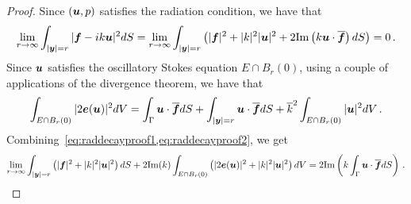 \begin{proof}
Since $({\boldsymbol u},p)$ satisfies the radiation condition, we have that
\begin{equation}
\lim_{r\to\infty} \int_{|{\boldsymbol y}|=r} | {\boldsymbol f} - i k {\boldsymbol u}|^2 dS = 
\lim_{r\to\infty} \int_{|{\boldsymbol y}| =r} \left( |{\boldsymbol f}|^2 + |k|^2|{\boldsymbol u}|^2 + 2 {\textrm{\textup{Im}}} 
\left( k {\boldsymbol u}\cdot \overline{{\boldsymbol f}} \right) dS \label{eq:raddecayproof1}
\right) = 0 \, . 
\end{equation}
Since ${\boldsymbol u}$ satisfies the oscillatory Stokes equation $E \cap B_{r}(0)$,
using a couple of applications of the divergence theorem, we have that
\begin{equation}
\int_{E\cap B_{r}(0)} |2 {\boldsymbol e}({\boldsymbol u})|^2 dV =
\int_{\Gamma} {\boldsymbol u} \cdot \overline{{\boldsymbol f}} dS
+ \int_{|{\boldsymbol y}|=r} {\boldsymbol u} \cdot \overline{{\boldsymbol f}} dS + \overline{k}^2 
\int_{E \cap B_{r}(0)} |{\boldsymbol u}|^2 dV \,. \label{eq:raddecayproof2}
\end{equation}
Combining~\cref{eq:raddecayproof1,eq:raddecayproof2}, we get
\begin{equation}
\lim_{r\to\infty} \int_{|{\boldsymbol y}|=r}\left(|{\boldsymbol f}|^2 + |k|^2 |{\boldsymbol u}|^2 \right) dS 
+ 2 {\textrm{\textup{Im}}}(k)\int_{E \cap B_{r}(0)} \left(|2{\boldsymbol e}({\boldsymbol u})|^2 + |k|^2 |{\boldsymbol u}|^2 
\right) dV = 2{\textrm{\textup{Im}}} \left ( k \int_{\Gamma} {\boldsymbol u} \cdot \overline{{\boldsymbol f}} dS \right) \, .
\end{equation}
\end{proof}

